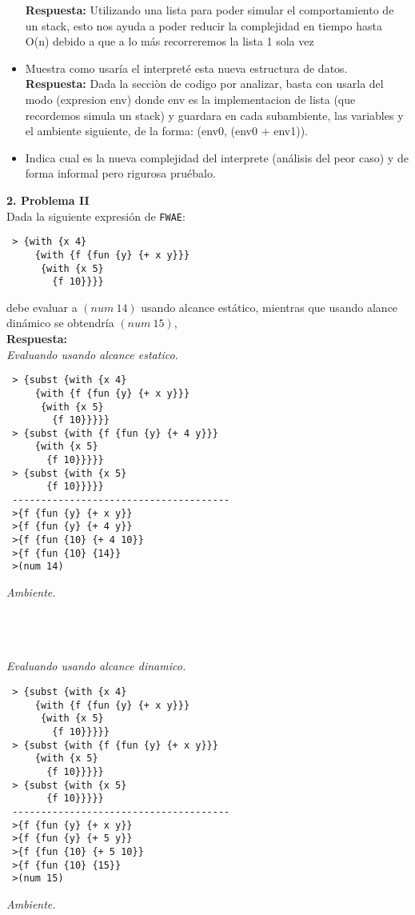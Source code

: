 \documentclass[letterpaper,11pt]{article}
\begin{document}
\begin{itemize}
  \textbf{Respuesta:}
    Utilizando una lista para poder simular el comportamiento de un stack, esto nos ayuda a poder reducir la complejidad en tiempo hasta O(n)
    debido a que a lo más recorreremos la lista 1 sola vez
 \item Muestra como usaría el interpreté esta nueva estructura de datos.
  \textbf{Respuesta: }
    Dada la secciòn de codigo por analizar, basta con usarla del modo (expresion env) donde env es la implementacion de lista (que recordemos simula un stack) y guardara en cada
    subambiente, las variables y el ambiente siguiente, de la forma: (env0, (env0 + env1)). 
 
 \item Indica cual es la nueva complejidad del interprete (análisis del peor caso) y de forma informal pero rigurosa pruébalo.
 \end{itemize}
 
 {\bf 2. Problema II}
 \\
 Dada la siguiente expresión de \texttt{FWAE}:
 \begin{verbatim}
 > {with {x 4}
     {with {f {fun {y} {+ x y}}}
      {with {x 5}
        {f 10}}}}
 \end{verbatim}
 debe evaluar a $(num\ 14)$ usando alcance estático, mientras que usando alance  dinámico se obtendría $(num\ 15)$, 
 \\
\textbf{Respuesta:} 
\\
\textit{Evaluando usando alcance estatico.}
 \begin{verbatim}
 > {subst {with {x 4}
     {with {f {fun {y} {+ x y}}}
      {with {x 5}
        {f 10}}}}}
 > {subst {with {f {fun {y} {+ 4 y}}}
     {with {x 5}
       {f 10}}}}}
 > {subst {with {x 5}
       {f 10}}}}}
 --------------------------------------
 >{f {fun {y} {+ x y}}
 >{f {fun {y} {+ 4 y}}
 >{f {fun {10} {+ 4 10}}
 >{f {fun {10} {14}}
 >(num 14) 
 \end{verbatim}
\textit{Ambiente.}
\\
\\
\\
\\
\textit{Evaluando usando alcance dinamico.}
 \begin{verbatim}
 > {subst {with {x 4}
     {with {f {fun {y} {+ x y}}}
      {with {x 5}
        {f 10}}}}}
 > {subst {with {f {fun {y} {+ x y}}}
     {with {x 5}
       {f 10}}}}}
 > {subst {with {x 5}
       {f 10}}}}}
 --------------------------------------
 >{f {fun {y} {+ x y}}
 >{f {fun {y} {+ 5 y}}
 >{f {fun {10} {+ 5 10}}
 >{f {fun {10} {15}}
 >(num 15) 
 \end{verbatim}
\textit{Ambiente.}
\\
\\
\\
\end{document}
